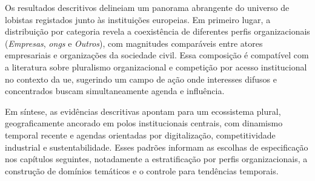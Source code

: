 Os resultados descritivos delineiam um panorama abrangente do universo de lobistas registados junto às instituições europeias. Em primeiro lugar, a distribuição por categoria revela a coexistência de diferentes perfis organizacionais (\textit{Empresas}, \textit{\acrshort{ong}s} e \textit{Outros}), com magnitudes comparáveis entre atores empresariais e organizações da sociedade civil. Essa composição é compatível com a literatura sobre pluralismo organizacional e competição por acesso institucional no contexto da \acrshort{ue}, sugerindo um campo de ação onde interesses difusos e concentrados buscam simultaneamente agenda e influência.

Em síntese, as evidências descritivas apontam para um ecossistema plural, geograficamente ancorado em polos institucionais centrais, com dinamismo temporal recente e agendas orientadas por digitalização, competitividade industrial e sustentabilidade. Esses padrões informam as escolhas de especificação nos capítulos seguintes, notadamente a estratificação por perfis organizacionais, a construção de domínios temáticos e o controle para tendências temporais.

